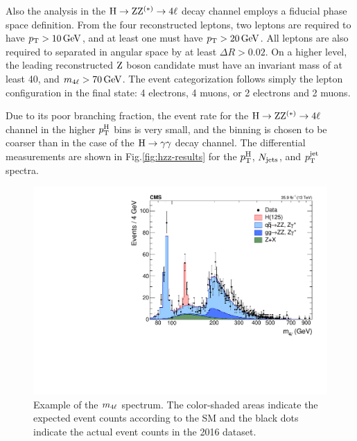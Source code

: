 Also the analysis in the $\mathrm{H}\to\mathrm{Z}\mathrm{Z}^{(\ast)}\to 4\ell$ decay channel employs a fiducial phase space definition.
% 
From the four reconstructed leptons, two leptons are required to have $p_\mathrm{T} > 10\,\text{GeV}$, and at least one must have $p_\mathrm{T} > 20\,\text{GeV}$.
% 
All leptons are also required to separated in angular space by at least $\Delta R > 0.02$.
% 
On a higher level, the leading reconstructed $\mathrm{Z}$ boson candidate must have an invariant mass of at least 40\GeV, and $m_{4\ell} > 70\,\text{GeV}$.
% 
The event categorization follows simply the lepton configuration in the final state: 4 electrons, 4 muons, or 2 electrons and 2 muons.


Due to its poor branching fraction, the event rate for the $\mathrm{H}\to\mathrm{Z}\mathrm{Z}^{(\ast)}\to 4\ell$ channel in the higher $p_\mathrm{T}^\mathrm{H}$ bins is very small, and the binning is chosen to be coarser than in the case of the $\mathrm{H}\to\mathrm{\gamma}\mathrm{\gamma}$ decay channel.
% 
The differential measurements are shown in Fig.\ref{fig:hzz-results} for the $p_\mathrm{T}^\mathrm{H}$, $N_\text{jets} $, and $p_\mathrm{T}^\text{jet} $ spectra.



\begin{figure}[hbtp]
  \begin{center}
    \includegraphics[width=0.7\linewidth]{img/inputs/hzz/m4lspectrum.pdf}
    \caption{
        Example of the $m_{4\ell}$ spectrum.
        The color-shaded areas indicate the expected event counts according to the SM and the black dots indicate the actual event counts in the 2016 dataset.
        }
    \label{fig:example_mfourl}
  \end{center}
\end{figure}

